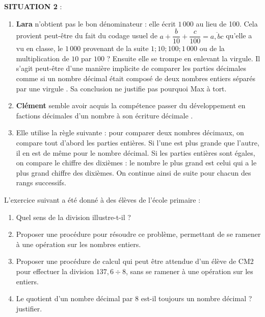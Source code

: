\begin{corrige}
{\bf SITUATION 2 }: \\
\begin{enumerate}
   \item {\bf Lara} n'obtient pas le bon dénominateur : elle écrit $1\,000$ au lieu de 100. Cela provient peut-être du fait du codage usuel de $a+\dfrac{b}{10}+\dfrac{c}{100} =\overline{a,bc}$ qu'elle a vu en classe, le $1\,000$ provenant de la suite $1 ; 10 ; 100 ; 1\,000$ ou de la multiplication de $10$ par $100$ ? Ensuite elle se trompe en enlevant la virgule. Il s'agit peut-être d'une manière implicite de comparer les parties décimales \og comme si un nombre décimal était composé de deux nombres entiers séparés par une virgule \fg. Sa conclusion ne justifie pas pourquoi Max à tort.
   \item {\bf Clément} semble avoir acquis la compétence \og passer du développement en factions décimales d'un nombre à son écriture décimale \fg.
   \item Elle utilise la règle suivante : pour comparer deux nombres décimaux, on compare tout d'abord les parties entières. Si l'une est plus grande que l'autre, il en est de même pour le nombre décimal. Si les parties entières sont égales, on compare le chiffre des dixièmes : le nombre le plus grand est celui qui a le plus grand chiffre des dixièmes. On continue ainsi de suite pour chacun des rangs successifs.
\end{enumerate}
\end{corrige}

\bigskip

\begin{exercice}[CRPE 2015 G3]
L'exercice suivant a été donné à des élèves de l'école primaire :
\vspace*{-6mm}
\begin{center}
\end{center}
\vspace*{-6mm}
\begin{enumerate}
   \item Quel sens de la division illustre-t-il ?
   \item Proposer une procédure pour résoudre ce problème, permettant de se ramener à une opération sur les nombres entiers.
   \item Proposer une procédure de calcul qui peut être attendue d'un élève de CM2 pour
effectuer la division $137,6\div8$, sans se ramener à une opération sur les entiers.
   \item Le quotient d'un nombre décimal par 8 est-il toujours un nombre décimal ? justifier.
\end{enumerate}
\end{exercice}

